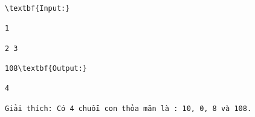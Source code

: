 \begin{verbatim}
\textbf{Input:}

1

2 3

108\textbf{Output:}

4

Giải thích: Có 4 chuỗi con thỏa mãn là : 10, 0, 8 và 108.\end{verbatim}